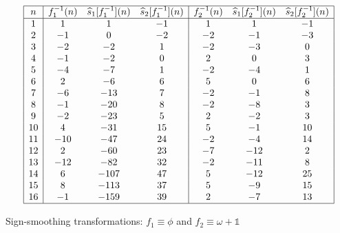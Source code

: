 \documentclass[12pt,reqno,a4letter]{article}
\numberwithin{figure}{section}
\numberwithin{table}{section}
\numberwithin{equation}{section}
\theoremstyle{plain}
\numberwithin{theorem}{section}
\theoremstyle{definition}
\begin{document}
\begin{table}[h!]
\begin{equation*}
\begin{array}{|c|ccc|ccc|} 
 \hline
 n & f_1^{-1}(n) & \widehat{s}_1[f_1^{-1}](n) & \widehat{s}_2[f_1^{-1}](n) & 
     f_2^{-1}(n) & \widehat{s}_1[f_2^{-1}](n) & 
     \widehat{s}_2[f_2^{-1}](n) \\ \hline
 1 & 1 & 1 & -1 & 1 & 1 & -1 \\
 2 & -1 & 0 & -2 & -2 & -1 & -3 \\
 3 & -2 & -2 & 1 & -2 & -3 & 0 \\
 4 & -1 & -2 & 0 & 2 & 0 & 3 \\
 5 & -4 & -7 & 1 & -2 & -4 & 1 \\
 6 & 2 & -6 & 6 & 5 & 0 & 6 \\
 7 & -6 & -13 & 7 & -2 & -1 & 8 \\
 8 & -1 & -20 & 8 & -2 & -8 & 3 \\
 9 & -2 & -23 & 5 & 2 & -2 & 3 \\
 10 & 4 & -31 & 15 & 5 & -1 & 10 \\
 11 & -10 & -47 & 24 & -2 & -4 & 14 \\
 12 & 2 & -60 & 23 & -7 & -12 & 2 \\
 13 & -12 & -82 & 32 & -2 & -11 & 8 \\
 14 & 6 & -107 & 47 & 5 & -12 & 25 \\
 15 & 8 & -113 & 37 & 5 & -9 & 15 \\
 16 & -1 & -159 & 39 & 2 & -7 & 13 \\
 \hline
\end{array}
\end{equation*}
\caption{Sign-smoothing transformations: $f_1 \equiv \phi$ and $f_2 \equiv \omega + \mathds{1}$}
\label{table_s12fn_SignSmoothingTF_v1}
\end{table}
\end{document}
